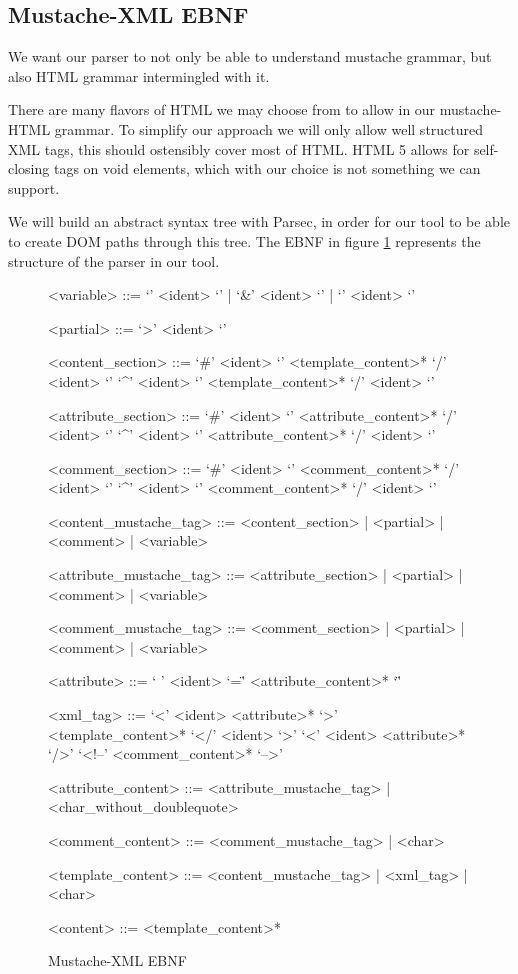 \subsection{Mustache-XML EBNF}
We want our parser to not only be able to understand mustache grammar, but also
HTML grammar intermingled with it.

There are many flavors of HTML we may choose from to allow in our
mustache-HTML grammar. To simplify our approach we will only allow well
structured XML tags, this should ostensibly cover most of HTML.
HTML 5 allows for self-closing tags on void elements, which with our choice is
not something we can support.

We will build an abstract syntax tree with Parsec, in order for our tool to be
able to create DOM paths through this tree. The EBNF in figure
\ref{fig:mustache-xml.ebnf} represents the structure of the parser in our tool.

\begin{figure}
	\centering
	\caption{Mustache-XML EBNF}
	\label{fig:mustache-xml.ebnf}
	\begin{grammar}
<variable> ::= `{{{' <ident> `}}}' | `{{&' <ident> `}}' | `{{' <ident> `}}'

<partial> ::= `{{>' <ident> `}}'

<content\_section> ::= `{{#' <ident> `}}' <template\_content>* `{{/' <ident> `}}'
                  \alt `{{^' <ident> `}}' <template\_content>* `{{/' <ident> `}}'

<attribute\_section> ::= `{{#' <ident> `}}' <attribute\_content>* `{{/' <ident> `}}'
                    \alt `{{^' <ident> `}}' <attribute\_content>* `{{/' <ident> `}}'

<comment\_section> ::= `{{\#' <ident> `}}' <comment\_content>* `{{/' <ident> `}}'
                  \alt `{{^' <ident> `}}' <comment\_content>* `{{/' <ident> `}}'

<content\_mustache\_tag> ::= <content\_section> | <partial> | <comment> | <variable>

<attribute\_mustache\_tag> ::= <attribute\_section> | <partial> | <comment> | <variable>

<comment\_mustache\_tag> ::= <comment\_section> | <partial> | <comment> | <variable>

<attribute> ::= ` ' <ident> `=\"' <attribute\_content>* `\"' 

<xml\_tag> ::= `<' <ident> <attribute>* `>' <template\_content>* `</' <ident> `>'
          \alt `<' <ident> <attribute>* `/>'
          \alt `<!--' <comment\_content>* `-->'

<attribute\_content> ::= <attribute\_mustache\_tag> | <char\_without\_doublequote>

<comment\_content> ::= <comment\_mustache\_tag> | <char>

<template\_content> ::= <content\_mustache\_tag> | <xml\_tag> | <char>

<content> ::= <template\_content>*
	\end{grammar}
\end{figure}


